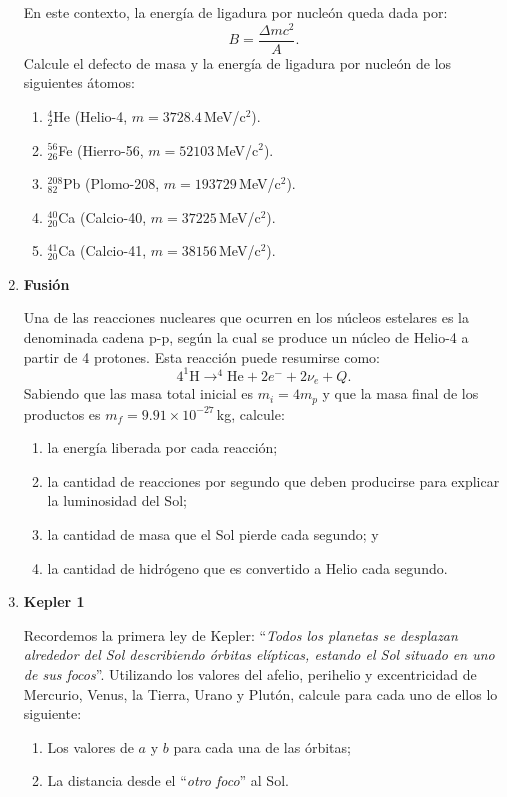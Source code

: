 \documentclass[a4paper,12pt]{article}
\begin{document}
\begin{enumerate}
	En este contexto, la energía de ligadura por nucleón queda dada por: \[ B =
	\frac{\Delta m c^2}{A}.\] Calcule el defecto de masa y la energía de
	ligadura por nucleón de los siguientes átomos:
	\begin{enumerate}
		\item $^4_2$He (Helio-4, $m=3728.4$\,MeV/c$^2$).
		\item $^{56}_{26}$Fe (Hierro-56, $m=52103$\,MeV/c$^2$).
		\item $^{208}_{82}$Pb (Plomo-208, $m=193729$\,MeV/c$^2$).
		\item $^{40}_{20}$Ca (Calcio-40, $m=37225$\,MeV/c$^2$).
		\item $^{41}_{20}$Ca (Calcio-41, $m=38156$\,MeV/c$^2$).
	\end{enumerate}

\item {\bf{Fusión}}

	Una de las reacciones nucleares que ocurren en los núcleos estelares es la
	denominada cadena p-p, según la cual se produce un núcleo de Helio-4 a
	partir de 4 protones. Esta reacción puede resumirse como: \[4 ^1\mathrm{H}
	\to ^4\mathrm{He} + 2 e^- + 2 \nu_e + Q.\] Sabiendo que las masa total
	inicial es $m_i=4 m_p$ y que la masa final de los productos es
	$m_f=9.91\times10^{-27}$\,kg, calcule: 
	\begin{enumerate}
		\item la energía liberada por cada reacción;
		\item la cantidad de reacciones por segundo que deben producirse para
			explicar la luminosidad del Sol; 
		\item la cantidad de masa que el Sol pierde cada segundo; y 
		\item la cantidad de hidrógeno que es convertido a Helio cada segundo. 
	\end{enumerate}

\item {\bf{Kepler 1}}
	
	Recordemos la primera ley de Kepler: ``{\emph{Todos los planetas se
	desplazan alrededor del Sol describiendo órbitas elípticas, estando el Sol
	situado en uno de sus focos}}''. Utilizando los valores del afelio,
	perihelio y excentricidad de Mercurio, Venus, la Tierra, Urano y Plutón,
	calcule para cada uno de ellos lo siguiente:
	\begin{enumerate}
		\item Los valores de $a$ y $b$ para cada una de las órbitas;
		\item La distancia desde el ``{\emph{otro foco}}'' al Sol.
	\end{enumerate}


\end{enumerate}
\end{document}
